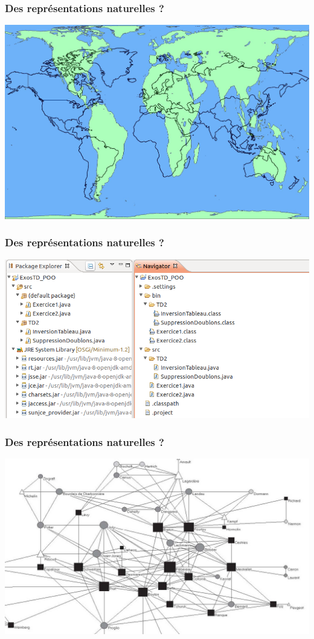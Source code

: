 \documentclass[11pt]{beamer}
\newenvironment{slide}[1]{%
\begin{frame}[environment=slide]
\frametitle{#1}
}{%
\end{frame}
}
\begin{document}
\begin{slide}{Des représentations naturelles ?}
\begin{center}

\includegraphics[scale=0.15]{projections}

\end{center}
\end{slide}

\begin{slide}{Des représentations naturelles ?}

\includegraphics[scale=0.35]{files}

\end{slide}

\begin{slide}{Des représentations naturelles ?}

\includegraphics[scale=0.6]{dudouet}

\end{slide}
\end{document}

